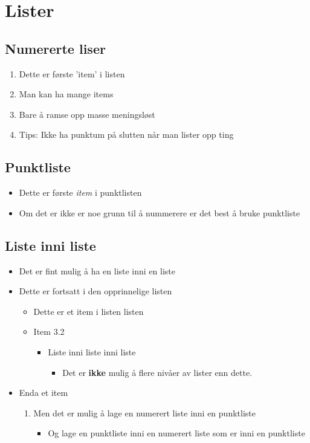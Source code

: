 \documentclass[11pt]{article}
\begin{document}
\section{Lister}
\subsection{Numererte liser}
\begin{enumerate}
	\item Dette er første 'item' i listen
	\item Man kan ha mange items
	\item Bare å ramse opp masse meningsløst
	\item Tips: Ikke ha punktum på slutten når man lister opp ting
\end{enumerate}

\subsection{Punktliste}
\begin{itemize}
	\item Dette er første \textit{item} i punktlisten
	\item Om det er ikke er noe grunn til å nummerere er det best å bruke punktliste
\end{itemize}

\subsection{Liste inni liste}
\begin{itemize}
	\item Det er fint mulig å ha en liste inni en liste
	\item Dette er fortsatt i den opprinnelige listen
	\begin{itemize}
		\item Dette er et item i listen listen
		\item Item 3.2
		\begin{itemize}
			\item Liste inni liste inni liste
			\begin{itemize}
				\item Det er \textbf{ikke} mulig å flere nivåer av lister enn dette.
			\end{itemize}
		\end{itemize}
	\end{itemize}
	\item Enda et item
	\begin{enumerate}
		\item Men det er mulig å lage en numerert liste inni en punktliste
		\begin{itemize}
			\item Og lage en punktliste inni en numerert liste som er inni en punktliste
		\end{itemize}
	\end{enumerate}
\end{itemize}
\end{document}
